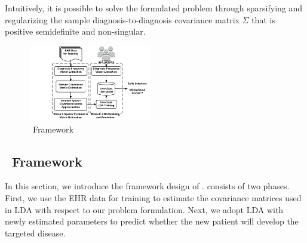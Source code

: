 Intuitively, it is possible to solve the formulated problem through sparsifying and regularizing the sample diagnosis-to-diagnosis covariance matrix $\Sigma$ that is positive semidefinite and non-singular. 


\begin{figure}
\begin{center}
\includegraphics[width=0.48\textwidth]{./img/daehr.pdf}
\end{center}
\caption{\TheName\ Framework}
\end{figure}


\subsection{\TheName\ Framework}
In this section, we introduce the framework design of \TheName{}. 
\TheName{} consists of two phases.  
First, we use the EHR data for training to estimate the covariance matrices used in LDA with respect to our problem formulation. 
Next, we adopt LDA with newly estimated parameters to predict whether the new patient will develop the targeted disease.


